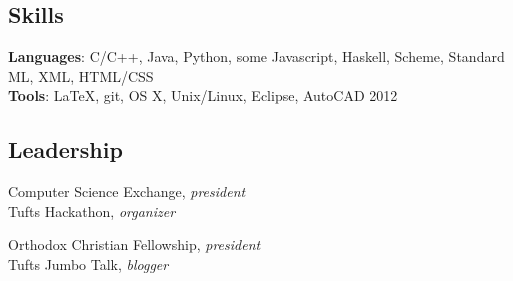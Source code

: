 \documentclass{article}
\newcommand{\skill}[2]{
  \textbf{#1}: #2
  \smallskip
}
\newcommand{\skillNS}[2]{
  \textbf{#1}: #2
}
\begin{document}
\begin{comment}
\subsection*{Projects}
  \skill{Type Inference}
        {Implemented Hindley-Milner type inference for a teaching language in
        ML. Wrote a constraint solver to assign types to correct terms and
        reject ill-typed terms.} \\
  \skill{TapItOut}
        {Developed the front end of a native Android app that allows
        peer-to-peer money transfer using NFC technology. Built at the 2013
        University Hacker Olympics in San Francisco.} \\
  \skill{Virtual Machine}
        {Designed and wrote a 32-bit virtual machine in C. Implemented a set of
        basic operations and a macro assembler to create executable binary
        files. Wrote a calculator program in assembly.}
\end{comment}

\subsection*{Skills}
  \skillNS{Languages} {C/C++, Java, Python, some Javascript,
                      Haskell, Scheme, Standard ML, XML, HTML/CSS}\\
  \skillNS{Tools}     {LaTeX, git, OS X, Unix/Linux, Eclipse, AutoCAD 2012}

\subsection*{Leadership}
\begin{minipage}[b]{0.5\linewidth}
Computer Science Exchange, \textit{president} \\
Tufts Hackathon, \textit{organizer}
\end{minipage}
\hspace{0.25cm}
\begin{minipage}[b]{0.5\linewidth}
Orthodox Christian Fellowship, \textit{president} \\
Tufts Jumbo Talk, \textit{blogger}
\end{minipage}
\end{document}
